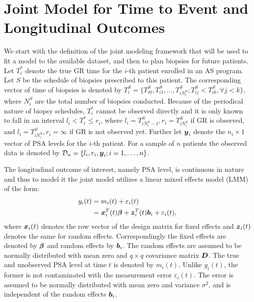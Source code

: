 \section{Joint Model for Time to Event and Longitudinal Outcomes}
\label{sec : jm_framework}
We start with the definition of the joint modeling framework that will be used to fit a model to the available dataset, and then to plan biopsies for future patients. Let $T_i^*$ denote the true GR time for the $i$-th patient enrolled in an AS program. Let $S$ be the schedule of biopsies prescribed to this patient. The corresponding vector of time of biopsies is denoted by $T_i^S = \{T^S_{i0}, T^S_{i1}, \ldots, T^S_{i{N_i^S}}; T^S_{ij} < T^S_{ik}, \forall j<k\}$, where $N_i^S$ are the total number of biopsies conducted. Because of the periodical nature of biopsy schedules, $T_i^*$ cannot be observed directly and it is only known to fall in an interval $l_i < T_i^* \leq r_i$, where $l_i = T^S_{i{N_i^S - 1}}, r_i = T^S_{i{N_i^S}}$ if GR is observed, and $l_i = T^S_{i{N_i^S}}, r_i=\infty$ if GR is not observed yet. Further let $\boldsymbol{y}_i$ denote the $n_i \times 1$  vector of PSA levels for the $i$-th patient. For a sample of $n$ patients the observed data is denoted by $\mathcal{D}_n = \{l_i, r_i, \boldsymbol{y}_i; i = 1, \ldots, n\}$.

The longitudinal outcome of interest, namely PSA level, is continuous in nature and thus to model it the joint model utilizes a linear mixed effects model (LMM) of the form:
\begin{equation*}
\begin{split}
y_i(t) &= m_i(t) + \varepsilon_i(t)\\
&=\boldsymbol{x}_i^T(t) \boldsymbol{\beta} + \boldsymbol{z}_i^T(t) \boldsymbol{b}_i + \varepsilon_i(t),
\end{split}
\end{equation*}
where $\boldsymbol{x}_i(t)$ denotes the row vector of the design matrix for fixed effects and $\boldsymbol{z}_i(t)$ denotes the same for random effects. Correspondingly the fixed effects are denoted by $\boldsymbol{\beta}$ and random effects by $\boldsymbol{b}_i$. The random effects are assumed to be normally distributed with mean zero and $q \times q$ covariance matrix $\boldsymbol{D}$. The true and unobserved PSA level at time $t$ is denoted by $m_i(t)$. Unlike $y_i(t)$, the former is not contaminated with the measurement error $\varepsilon_i(t)$. The error is assumed to be normally distributed with mean zero and variance $\sigma^2$, and is independent of the random effects $\boldsymbol{b}_i$.

